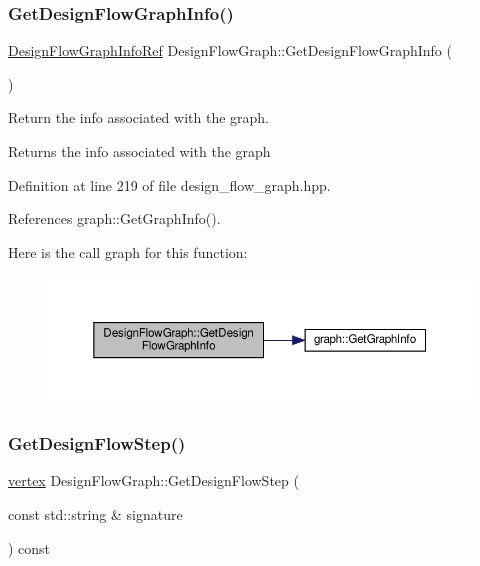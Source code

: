 \subsubsection{\texorpdfstring{Get\+Design\+Flow\+Graph\+Info()}{GetDesignFlowGraphInfo()}}
{\footnotesize\ttfamily \hyperlink{design__flow__graph_8hpp_aacc9497886d3ea02b43b537e6fceca72}{Design\+Flow\+Graph\+Info\+Ref} Design\+Flow\+Graph\+::\+Get\+Design\+Flow\+Graph\+Info (\begin{DoxyParamCaption}{ }\end{DoxyParamCaption})\hspace{0.3cm}{\ttfamily [inline]}}



Return the info associated with the graph. 

\begin{DoxyReturn}{Returns}
the info associated with the graph 
\end{DoxyReturn}


Definition at line 219 of file design\+\_\+flow\+\_\+graph.\+hpp.



References graph\+::\+Get\+Graph\+Info().

Here is the call graph for this function\+:
\nopagebreak
\begin{figure}[H]
\begin{center}
\leavevmode
\includegraphics[width=350pt]{de/de0/classDesignFlowGraph_a4f6d9efa952efe1ddde16382a7454a21_cgraph}
\end{center}
\end{figure}
\mbox{\label{classDesignFlowGraph_aba5af617d4377a9aab3dba14d2d5bf62}} 
\subsubsection{\texorpdfstring{Get\+Design\+Flow\+Step()}{GetDesignFlowStep()}}
{\footnotesize\ttfamily \hyperlink{graph_8hpp_abefdcf0544e601805af44eca032cca14}{vertex} Design\+Flow\+Graph\+::\+Get\+Design\+Flow\+Step (\begin{DoxyParamCaption}\item[{const std\+::string \&}]{signature }\end{DoxyParamCaption}) const}




